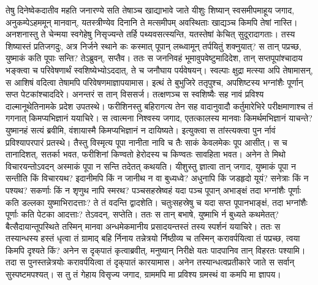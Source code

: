 \adhyAya
{}
\vakya तेषु दिनेष्वेकदातीव महति जनारण्ये सति तेषाञ्च खाद्याभावे जाते यीशुः शिष्यान् स्वसमीपमाहूय जगाद,
\vakya अनुकम्पेऽहममून् मानवान्, यतस्त्रीण्येव दिनानि ते मत्समीपम् अवस्थिताः खाद्यञ्च किमपि तेषां नास्ति।
\vakya अनशनास्तु ते चेन्मया स्वगेहेषु निसृज्यन्ते तर्हि पथ्यवसत्स्यन्ति, यतस्तेषां केचित् सुदूरादागताः।
\vakya तस्य शिष्यास्तं प्रतिजगदुः, अत्र निर्जने स्थाने कः कस्मात् पूपान् लब्ध्वामून् तर्पयितुं शक्नुयात्?
\vakya स तान् पप्रच्छ, युष्माकं कति पूपाः सन्ति? तेऽब्रुवन्, सप्तैव।
\vakya ततः स जननिवहं भूमावुपवेष्टुमादिदेश, तान् सप्तपूपांश्चादाय भङ्क्त्वा च परिवेषणार्थं स्वशिष्येभ्योऽददात्, ते च जनौघाय पर्यवेषयन्।
\vakya स्वल्पाः क्षुद्रा मत्स्या अपि तेषामासन्, स आशिषं वदित्वा तेषामपि परिवेषणमाज्ञापयामास।
\vakya इत्थं ते बुभुजिरे ततृपुश्च, अपशिष्टस्य भग्नांशैः पूर्णान् सप्त पेटकांश्चाददिरे।
\vakya अनन्तरं स तान् विससर्ज।
\vakya तत्क्षणञ्च स स्वशिष्यैः सह नावं प्रविश्य दाल्मानूथेतिनामके प्रदेश उपतस्थे।
\vakya फरीशिनस्तु बहिरागत्य तेन सह वादानुवादौ कर्तुमारेभिरे परीक्षमाणाश्च तं गगनात् किमप्यभिज्ञानं ययाचिरे।
\vakya स त्वात्मना निश्वस्य जगाद, एतत्कालस्य मानवाः किमर्थमभिज्ञानं याचन्ते? युष्मानहं सत्यं ब्रवीमि, वंशायास्मै किमप्यभिज्ञानं न दायिष्यते।
\vakya इत्युक्त्वा स तांस्त्यक्त्वा पुन र्नावं प्रविश्यापरपारं प्रतस्थे।
\vakya तैस्तु विस्मृत्य पूपा नानीता नावि च तैः साकं केवलमेकः पूप आसीत्।
\vakya स च तानादिशत्, सतर्का भवत, फरीशिनां किण्वतो हेरोदस्य च किण्वतः सावहिता भवत।
\vakya अनेन ते मिथो विचारयन्तोऽवदन् अस्माकं पूपा न सन्ति तदेतत् कथयति।
\vakya यीशुस्तु ज्ञात्वा तान् जगाद, युष्माकं पूपा न सन्तीति किं विचारयथ? इदानीमपि किं न जानीथ न वा बुध्यध्वे? अधुनापि किं जडहृदो यूयं?
\vakya सनेत्राः किं न पश्यथ? सकर्णाः किं न शृणुथ नापि स्मरथ?
\vakya पञ्चसहस्रेष्वहं यदा पञ्च पूपान् अभाङ्क्षं तदा भग्नांशैः पूर्णाः कति डल्लका युष्माभिरादत्ताः? ते तं वदन्ति द्वादशेति।
\vakya चतुःसहस्रेषु च यदा सप्त पूपानभाङ्क्षं, तदा भग्नांशैः पूर्णाः कति पेटका आदत्ताः? तेऽवदन्, सप्तेति।
\vakya ततः स तान् बभाषे, युष्माभि र्न बुध्यते कथमेतत्?
\vakya बैत्सैदायान्तूपस्थिते तस्मिन् मानवा अन्धमेकमानीय प्रसादयन्तस्तं तस्य स्पर्शनं ययाचिरे।
\vakya ततः स तस्यान्धस्य हस्तं धृत्वा तं ग्रामाद् बहि र्निनाय तन्नेत्रयो र्निष्ठीव्य च तस्मिन् करावर्पयित्वा तं पप्रच्छ, त्वया किमपि दृश्यते किं?
\vakya अनेन स दृक्‌पातं कृत्वाब्रवीत्, मनुष्यान् निरीक्षे यतः पादपानिव तान् विहरतः पश्यामि।
\vakya तदा स पुनस्तन्नेत्रयोः करावर्पयित्वा तं दृक्‌पातं कारयामास। अनेन तस्यान्धत्वप्रतीकारे जाते स सर्वान् सुस्पष्टमपश्यत्।
\vakya स तु तं गेहाय विसृज्य जगाद, ग्राममपि मा प्रविश्य ग्रमस्थं वा कमपि मा ज्ञापय।
